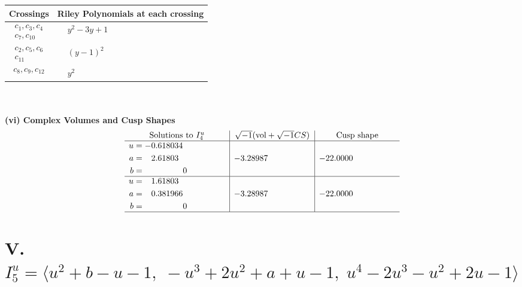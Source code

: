 \documentclass[1p]{elsarticle_modified}
\theoremstyle{definition}
\newcommand{\I}{\sqrt{-1}}
\begin{document}
\begin{tabular}{m{50pt}|m{274pt}}
Crossings & \hspace{64pt}Riley Polynomials at each crossing \\
\hline $$\begin{aligned}c_{1},c_{3},c_{4}\\c_{7},c_{10}\end{aligned}$$&$\begin{aligned}
&y^2-3 y+1
\end{aligned}$\\
\hline $$\begin{aligned}c_{2},c_{5},c_{6}\\c_{11}\end{aligned}$$&$\begin{aligned}
&(y-1)^2
\end{aligned}$\\
\hline $$\begin{aligned}c_{8},c_{9},c_{12}\end{aligned}$$&$\begin{aligned}
&y^2
\end{aligned}$\\
\hline
\end{tabular}\\~\\
\newpage\flushleft \textbf{(vi) Complex Volumes and Cusp Shapes}
$$\begin{array}{c|c|c}  
\text{Solutions to }I^u_{4}& \I (\text{vol} + \sqrt{-1}CS) & \text{Cusp shape}\\
 \hline 
\begin{aligned}
u &= -0.618034\phantom{ +0.000000I} \\
a &= \phantom{-}2.61803\phantom{ +0.000000I} \\
b &= \phantom{-0.000000 } 0\end{aligned}
 & -3.28987\phantom{ +0.000000I} & -22.0000\phantom{ +0.000000I} \\ \hline\begin{aligned}
u &= \phantom{-}1.61803\phantom{ +0.000000I} \\
a &= \phantom{-}0.381966\phantom{ +0.000000I} \\
b &= \phantom{-0.000000 } 0\end{aligned}
 & -3.28987\phantom{ +0.000000I} & -22.0000\phantom{ +0.000000I}\\
 \hline 
 \end{array}$$\newpage\newpage\renewcommand{\arraystretch}{1}
\centering \section*{V. $I^u_{5}= \langle u^2+b- u-1,\;- u^3+2 u^2+a+u-1,\;u^4-2 u^3- u^2+2 u-1 \rangle$}
\end{document}
